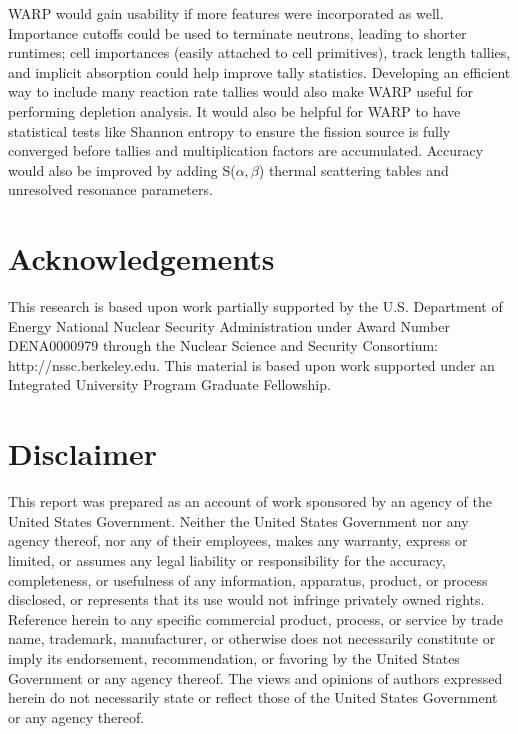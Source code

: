 \documentclass[preprint,12pt]{elsarticle}
\begin{document}
WARP would gain usability if more features were incorporated as well.  Importance cutoffs could be used to terminate neutrons, leading to shorter runtimes; cell importances (easily attached to cell primitives), track length tallies, and implicit absorption could help improve tally statistics.  Developing an efficient way to include many reaction rate tallies would also make WARP useful for performing depletion analysis.  It would also be helpful for WARP to have statistical tests like Shannon entropy to ensure the fission source is fully converged before tallies and multiplication factors are accumulated.  Accuracy would also be improved by adding S($\alpha,\beta$) thermal scattering tables and unresolved resonance parameters.



\section*{Acknowledgements}
\label{sec:ack}

This research is based upon work partially supported by the U.S. Department of Energy National Nuclear Security Administration under Award Number DENA0000979 through the Nuclear Science and Security Consortium: http://nssc.berkeley.edu.
This material is based upon work supported under an Integrated University Program Graduate Fellowship.

\section*{Disclaimer}
\label{sec:disc}

This report was prepared as an account of work sponsored by an agency of the United States Government. Neither the United States Government nor any agency thereof, nor any of their employees, makes any warranty, express or limited, or assumes any legal liability or responsibility for the accuracy, completeness, or usefulness of any information, apparatus, product, or process disclosed, or represents that its use would not infringe privately owned rights. Reference herein to any specific commercial product, process, or service by trade name, trademark, manufacturer, or otherwise does not necessarily constitute or imply its endorsement, recommendation, or favoring by the United States Government or any agency thereof. The views and opinions of authors expressed herein do not necessarily state or reflect those of the United States Government or any agency thereof.



\end{document}
